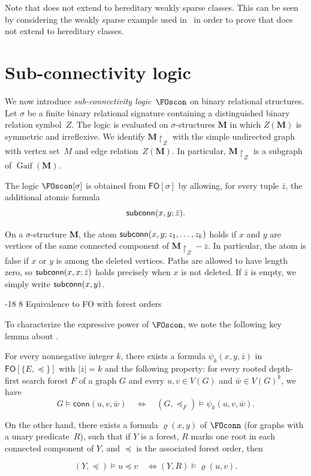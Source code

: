 \documentclass[1p,number,11pt]{elsarticle}
\makeatletter
\renewcommand\subsection{\@startsection{subsection}{2}{\z@}%
  {-18\p@ \@plus -4\p@ \@minus -4\p@}%
  {8\p@ \@plus 4\p@ \@minus 4\p@}%
  {\normalfont\normalsize\bfseries}}
\newcommand{\scon}{\hbox{\sf subconn}}
\newcommand{\Gaif}{\operatorname{Gaif}}
\theoremstyle{plain}
\newcommand{\conn}{\mathsf{conn}}
\newcommand{\MZ}{\mathbf M\!\upharpoonright_Z}
\renewcommand{\FO}{\ensuremath{\mathsf{FO}}}
\makeatother
\begin{document}
Note that  does not extend to hereditary
weakly sparse classes. This can be seen by considering the weakly sparse example
used in~\cite{bonnet2022twin} in order to prove that  does not
extend to hereditary classes.

\section{Sub-connectivity logic}\label{sec:subconn-logic}

We now introduce \emph{sub-connectivity logic}~$\FOscon$ on binary relational
structures. Let $\sigma$ be a finite binary relational signature containing a
distinguished binary relation symbol~$Z$. The logic is evaluated on
$\sigma$-structures $\mathbf M$ in which $Z(\mathbf M)$ is symmetric and
irreflexive. We identify $\MZ$ with the simple undirected
graph with vertex set~$M$ and edge relation~$Z(\mathbf M)$. In particular,
$\MZ$ is a subgraph of $\Gaif(\mathbf M)$.

The logic $\FOscon[\sigma]$ is obtained from $\FO[\sigma]$ by allowing, for
every tuple $\bar z$, the additional atomic formula
\[
   \scon(x,y;\bar z).
\]

On a $\sigma$-structure $\mathbf M$, the atom
$\scon(x,y;z_1,\ldots,z_k)$ holds if $x$ and $y$ are vertices of the same
connected component of $\mathbf M\!\upharpoonright_Z-\bar z$. In particular,
the atom is false if $x$ or $y$ is among the deleted vertices. Paths are
allowed to have length zero, so $\scon(x,x;\bar z)$ holds precisely when $x$
is not deleted. If $\bar z$ is empty, we simply write $\scon(x,y)$.


\subsection{Equivalence to FO with forest orders}\label{sec:FOFO}


To characterize the expressive power of $\FOscon$, we note the following key lemma about \FOconn. 

\begin{lemma}
\label{lem:con=FO}
    For every nonnegative integer $k$,
    there exists a formula $\psi_k(x,y,\bar z)$ in $\FO[\{E,\preceq\}]$ with $|\bar z|=k$ and the following property:
    for every rooted depth-first search forest $F$ of a graph $G$ and every $u,v\in V(G)$ and $\bar w\in V(G)^k$, we have
    \[
    G\models \conn(u,v,\bar w)\quad\iff\quad (G,\preceq_F)\models \psi_k(u,v,\bar w).
    \]

     On the other hand,
     there exists a formula $\varrho(x,y)$ of $\FOconn$ (for graphs with a unary predicate~$R$),  such that if $Y$ is a forest, $R$ marks one root in each connected component of $Y$, and $\preceq$ is the associated forest order, then
     
\[
(Y,\preceq)\models u\preceq v\quad\iff (Y,R)\models \varrho(u,v).
\]
\end{lemma}
\end{document}
